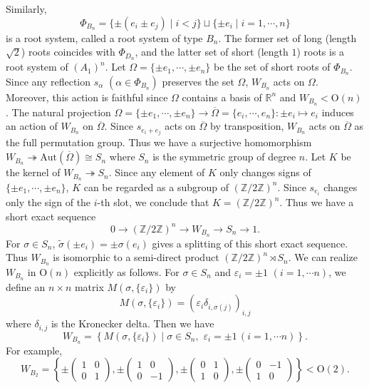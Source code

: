 \documentclass{amsart}
\theoremstyle{definition}
\theoremstyle{remark}
\numberwithin{equation}{section}
\begin{document}
Similarly, 
\[
\Phi_{B_n} = \{ \pm ( e_i \pm e_j ) \mid i < j \} 
\sqcup \{ \pm e_i \mid i = 1, \cdots , n \} 
\]
is a root system, called a root system of type $B_n$.
The former set of long (length $\sqrt{2}$) roots coincides with $\Phi_{D_n}$,
and the latter set of short (length $1$) roots is a root system of $(A_1)^{n}$.
Let $\Omega = \{ \pm e_1, \cdots , \pm e_n\}$ be the set of short roots of $\Phi_{B_n}$.
Since any reflection $s_{\alpha}$ $(\alpha \in \Phi_{B_n})$ preserves the set $\Omega$, 
$W_{B_n}$ acts on $\Omega$.
Moreover, this action is faithful since $\Omega$ contains a basis of $\mathbb{R}^n$ 
and $W_{B_n} < \mathrm{O}(n)$. 
The natural projection 
$\Omega = \{ \pm e_1 , \cdots , \pm e_n \} \to 
\overline{\Omega} = \{ e_i , \cdots , e_n \} :
\pm e_i \mapsto e_i$ induces an action of $W_{B_n}$ on $\overline{\Omega}$.
Since $s_{e_i + e_j}$ acts on $\overline{\Omega}$ by transposition, 
$W_{B_n}$ acts on $\overline{\Omega}$ as the full permutation group. 
Thus we have a surjective homomorphism 
$W_{B_n} \twoheadrightarrow \mathrm{Aut}(\overline{\Omega}) \cong S_n$ 
where $S_n$ is the symmetric group of degree $n$.
Let $K$ be the kernel of $W_{B_n} \twoheadrightarrow S_n$.
Since any element of $K$ only changes signs of $\{ \pm e_1 , \cdots , \pm e_n\}$, 
$K$ can be regarded as a subgroup of $(\mathbb{Z} / 2 \mathbb{Z})^n$.
Since $s_{e_i}$ changes only the sign of the $i$-th slot, we conclude that 
$K = (\mathbb{Z} / 2 \mathbb{Z})^n$.
Thus we have a short exact sequence 
\[
0 \to (\mathbb{Z} / 2 \mathbb{Z})^n \to W_{B_n} \to S_n \to 1.
\]
For $\sigma \in S_n$, $\widetilde{\sigma} (\pm e_i) = \pm \sigma (e_i)$ gives 
a splitting of this short exact sequence.
Thus $W_{B_n}$ is isomorphic to a semi-direct product 
$(\mathbb{Z} / 2 \mathbb{Z})^n \rtimes S_n$.
We can realize $W_{B_n}$ in $\mathrm{O}(n)$ explicitly as follows.
For $\sigma \in S_n$ and $\varepsilon_i = \pm 1$ $(i = 1, \cdots n)$, 
we define an $n \times n$ matrix $M(\sigma, \{ \varepsilon_i \})$ by 
\begin{equation}
\label{eq:definition_of_M_sigma_epsilon}
M(\sigma, \{ \varepsilon_i \} ) = (\varepsilon_i \delta_{i, \sigma(j)})_{i, j}
\end{equation}
where $\delta_{i, j}$ is the Kronecker delta. 
Then we have
\begin{equation}
W_{B_n} = \left\{ M(\sigma , \{ \varepsilon_i \})
\mid \sigma \in S_n , \,\, \varepsilon_i = \pm 1 \, (i = 1, \cdots n) \right\}.
\end{equation}
For example, 
\[
W_{B_2} = \left\{  
\pm \begin{pmatrix} 1 & 0 \\ 0 & 1 \end{pmatrix}, 
\pm \begin{pmatrix} 1 & 0 \\ 0 & -1 \end{pmatrix}, 
\pm \begin{pmatrix} 0 & 1 \\ 1 & 0 \end{pmatrix}, 
\pm \begin{pmatrix} 0 & -1 \\ 1 & 0 \end{pmatrix}
\right\}  < \mathrm{O}(2).
\]
\end{document}

